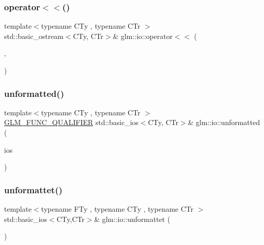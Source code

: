 \mbox{\label{namespaceglm_1_1io_a72020640c68a8c4e010b7d3f02a0ca92}} 
\subsubsection{\texorpdfstring{operator$<$$<$()}{operator<<()}\hspace{0.1cm}{\footnotesize\ttfamily [8/8]}}
{\footnotesize\ttfamily template$<$typename C\+Ty , typename C\+Tr $>$ \\
std\+::basic\+\_\+ostream$<$C\+Ty, C\+Tr$>$\& glm\+::io\+::operator$<$$<$ (\begin{DoxyParamCaption}\item[{std\+::basic\+\_\+ostream$<$ C\+Ty, C\+Tr $>$ \&}]{,  }\item[{\mbox{\hyperlink{structglm_1_1io_1_1order}{order}} const \&}]{ }\end{DoxyParamCaption})}

\mbox{\label{namespaceglm_1_1io_a8f950faa7ad67cac1287beaf896a8bb6}} 
\subsubsection{\texorpdfstring{unformatted()}{unformatted()}}
{\footnotesize\ttfamily template$<$typename C\+Ty , typename C\+Tr $>$ \\
\mbox{\hyperlink{setup_8hpp_a33fdea6f91c5f834105f7415e2a64407}{G\+L\+M\+\_\+\+F\+U\+N\+C\+\_\+\+Q\+U\+A\+L\+I\+F\+I\+ER}} std\+::basic\+\_\+ios$<$C\+Ty, C\+Tr$>$\& glm\+::io\+::unformatted (\begin{DoxyParamCaption}\item[{std\+::basic\+\_\+ios$<$ C\+Ty, C\+Tr $>$ \&}]{ios }\end{DoxyParamCaption})}

\mbox{\label{namespaceglm_1_1io_a3095de031a9c7c3dd9bab670381c3cdb}} 
\subsubsection{\texorpdfstring{unformattet()}{unformattet()}}
{\footnotesize\ttfamily template$<$typename F\+Ty , typename C\+Ty , typename C\+Tr $>$ \\
std\+::basic\+\_\+ios$<$C\+Ty,C\+Tr$>$\& glm\+::io\+::unformattet (\begin{DoxyParamCaption}\item[{std\+::basic\+\_\+ios$<$ C\+Ty, C\+Tr $>$ \&}]{ }\end{DoxyParamCaption})}

